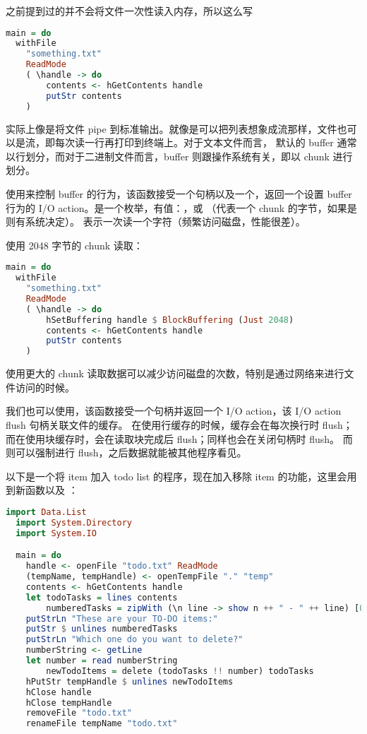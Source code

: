 \documentclass[./main.tex]{subfiles}
\begin{document}
之前提到过的并不会将文件一次性读入内存，所以这么写

\begin{lstlisting}[language=Haskell]
  main = do
  withFile
    "something.txt"
    ReadMode
    ( \handle -> do
        contents <- hGetContents handle
        putStr contents
    )
\end{lstlisting}

实际上像是将文件 pipe 到标准输出。就像是可以把列表想象成流那样，文件也可以是流，即每次读一行再打印到终端上。对于文本文件而言，
默认的 buffer 通常以行划分，而对于二进制文件而言，buffer 则跟操作系统有关，即以 chunk 进行划分。

使用来控制 buffer 的行为，该函数接受一个句柄以及一个，返回一个设置 buffer
行为的 I/O action。是一个枚举，有值：，或
（代表一个 chunk 的字节，如果是则有系统决定）。
表示一次读一个字符（频繁访问磁盘，性能很差）。

使用 2048 字节的 chunk 读取：

\begin{lstlisting}[language=Haskell]
  main = do
  withFile
    "something.txt"
    ReadMode
    ( \handle -> do
        hSetBuffering handle $ BlockBuffering (Just 2048)
        contents <- hGetContents handle
        putStr contents
    )
\end{lstlisting}

使用更大的 chunk 读取数据可以减少访问磁盘的次数，特别是通过网络来进行文件访问的时候。

我们也可以使用，该函数接受一个句柄并返回一个 I/O action，该 I/O action flush 句柄关联文件的缓存。
在使用行缓存的时候，缓存会在每次换行时 flush；而在使用块缓存时，会在读取块完成后 flush；同样也会在关闭句柄时 flush。
而则可以强制进行 flush，之后数据就能被其他程序看见。

以下是一个将 item 加入 todo list 的程序，现在加入移除 item 的功能，这里会用到新函数以及
：

\begin{lstlisting}[language=Haskell]
  import Data.List
  import System.Directory
  import System.IO

  main = do
    handle <- openFile "todo.txt" ReadMode
    (tempName, tempHandle) <- openTempFile "." "temp"
    contents <- hGetContents handle
    let todoTasks = lines contents
        numberedTasks = zipWith (\n line -> show n ++ " - " ++ line) [0 ..] todoTasks
    putStrLn "These are your TO-DO items:"
    putStr $ unlines numberedTasks
    putStrLn "Which one do you want to delete?"
    numberString <- getLine
    let number = read numberString
        newTodoItems = delete (todoTasks !! number) todoTasks
    hPutStr tempHandle $ unlines newTodoItems
    hClose handle
    hClose tempHandle
    removeFile "todo.txt"
    renameFile tempName "todo.txt"
\end{lstlisting}
\end{document}
